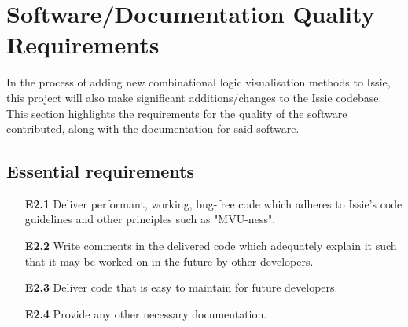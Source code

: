 
\section{Software/Documentation Quality Requirements}
In the process of adding new combinational logic visualisation methods to Issie, this project will also make significant additions/changes to the Issie codebase. This section highlights the requirements for the quality of the software contributed, along with the documentation for said software.
\subsection*{Essential requirements}
\begin{itemize}
    \item[\textbf{E2.1}] Deliver performant, working, bug-free code which adheres to Issie's code guidelines and other principles such as "MVU-ness".
    \medskip
    \item[\textbf{E2.2}] Write comments in the delivered code which adequately explain it such that it may be worked on in the future by other developers. 
    \medskip
    \item[\textbf{E2.3}] Deliver code that is easy to maintain for future developers.
    \medskip
    \item[\textbf{E2.4}] Provide any other necessary documentation.
\end{itemize}

